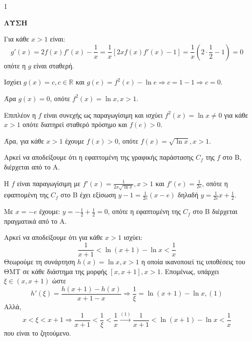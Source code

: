 \begin{ylh}{1}
    \item [Ύλη από εικόνα]
\end{ylh}
\textbf{ΛΥΣΗ}

\begin{alist}
\item Για κάθε $x>1$ είναι:
\[ g'(x)=2f(x)f'(x)-\frac{1}{x}=\frac{1}{x}[2xf(x)f'(x)-1]=\frac{1}{x}\left(2\cdot\frac{1}{2}-1\right)=0 \]
οπότε η $g$ είναι σταθερή.

Ισχύει $g(x)=c, c\in\mathbb{R}$ και $g(e)=f^2(e)-\ln e \Rightarrow c=1-1 \Rightarrow c=0$.

Άρα $g(x)=0$, οπότε $f^2(x)=\ln x, x>1$.

Επιπλέον η $f$ είναι συνεχής ως παραγωγίσιμη και ισχύει $f^2(x)=\ln x \ne 0$ για κάθε $x>1$ οπότε διατηρεί σταθερό πρόσημο και $f(e)>0$.

Άρα, για κάθε $x>1$ έχουμε $f(x)>0$, οπότε $f(x)=\sqrt{\ln x}, x>1$.

\item Αρκεί να αποδείξουμε ότι η εφαπτομένη της γραφικής παράστασης $C_f$ της $f$ στο B, διέρχεται από το A.

Η $f$ είναι παραγωγίσιμη με $f'(x)=\frac{1}{2x\sqrt{\ln x}}, x>1$ και $f'(e)=\frac{1}{2e}$, οπότε η εφαπτομένη της $C_f$ στο B έχει εξίσωση $y-1=\frac{1}{2e}(x-e)$ δηλαδή $y=\frac{1}{2e}x+\frac{1}{2}$.

Με $x=-e$ έχουμε: $y=-\frac{1}{2}+\frac{1}{2}=0$, οπότε η εφαπτομένη της $C_f$ στο B διέρχεται πραγματικά από το A.

\item Αρκεί να αποδείξουμε ότι για κάθε $x>1$ ισχύει:
\[ \frac{1}{x+1}<\ln(x+1)-\ln x<\frac{1}{x} \]
Θεωρούμε τη συνάρτηση $h(x)=\ln x, x>1$ η οποία ικανοποιεί τις υποθέσεις του ΘΜΤ σε κάθε διάστημα της μορφής $[x, x+1], x>1$. Επομένως, υπάρχει $\xi \in (x, x+1)$ ώστε
\[ h'(\xi)=\frac{h(x+1)-h(x)}{x+1-x} \Rightarrow \frac{1}{\xi}=\ln(x+1)-\ln x, (1) \]
Αλλά,
\[ x<\xi<x+1 \Rightarrow \frac{1}{x+1}<\frac{1}{\xi}<\frac{1}{x} \xrightarrow{(1)} \frac{1}{x+1}<\ln(x+1)-\ln x<\frac{1}{x} \]
που είναι το ζητούμενο.
\end{alist}